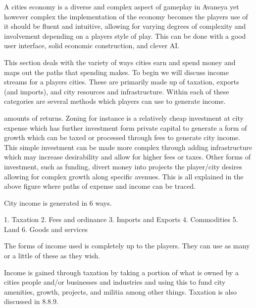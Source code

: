 


A cities economy is a diverse and complex aspect of gameplay in Avaneya yet however complex the implementation of the economy becomes the players use of it should be fluent and intuitive, allowing for varying degrees of complexity and involvement depending on a players style of play. This can be done with a good user interface, solid economic construction, and clever AI. 

This section deals with the variety of ways cities earn and spend money and maps out the paths that spending makes. To begin we will discuss income streams for a players cities. These are primarily made up of taxation, exports (and imports), and city resources and infrastructure. Within each of these categories are several methods which players can use to generate income.


amounts of returns. Zoning for instance is a relatively cheap investment at city expense which has further investment form private capital to generate a form of growth which can be taxed or processed through fees to generate city income. This simple investment can be made more complex through adding infrastructure which may increase desirability and allow for higher fees or taxes. Other forms of investment, such as funding, divert money into projects the player/city desires allowing for complex growth along specific avenues. This is all explained in the above figure where paths of expense and income can be traced.





City income is generated in 6 ways.

1.  Taxation
2.  Fees and ordinance
3.  Imports and Exports
4.  Commodities
5.  Land
6.  Goods and services

The forms of income used is completely up to the players. They can use as many or a little of these as they wish.

Income is gained through taxation by taking a portion of what is owned by a cities people and/or businesses and industries and using this to fund city amenities, growth, projects, and militia among other things. Taxation is also discussed in 8.8.9.

